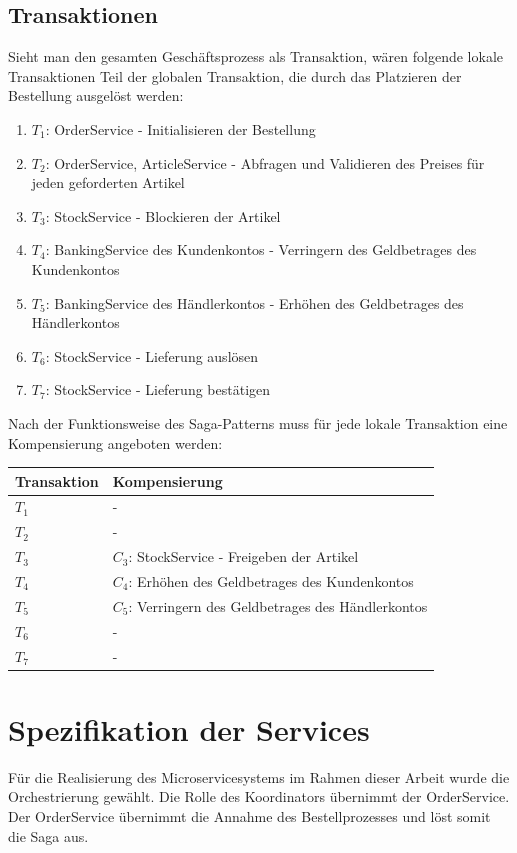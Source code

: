 \subsection{Transaktionen}
Sieht man den gesamten Geschäftsprozess als Transaktion, wären folgende lokale Transaktionen Teil der globalen Transaktion, die durch das Platzieren der Bestellung ausgelöst werden:
\begin{enumerate}
	\item $T_1$: OrderService - Initialisieren der Bestellung
	\item $T_2$: OrderService, ArticleService - Abfragen und Validieren des Preises für jeden geforderten Artikel 
	\item $T_3$: StockService - Blockieren der Artikel
	\item $T_4$: BankingService des Kundenkontos - Verringern des Geldbetrages des Kundenkontos
	\item $T_5$: BankingService des Händlerkontos - Erhöhen des Geldbetrages des Händlerkontos
	\item $T_6$: StockService - Lieferung auslösen
	\item $T_7$: StockService - Lieferung bestätigen
\end{enumerate}

Nach der Funktionsweise des Saga-Patterns muss für jede lokale Transaktion eine Kompensierung angeboten werden:

\begin{tabular}[h]{|l|l|}
	\hline
	Transaktion & Kompensierung \\ \hline
	$T_1$ & - \\ \hline
	$T_2$ & - \\ \hline
	$T_3$ & $C_3$: StockService - Freigeben der Artikel \\ \hline
	$T_4$ & $C_4$: Erhöhen des Geldbetrages des Kundenkontos \\ \hline
	$T_5$ & $C_5$: Verringern des Geldbetrages des Händlerkontos \\ \hline
	$T_6$ &  - \\ \hline
	$T_7$ &  - \\ \hline
\end{tabular}


\section{Spezifikation der Services}

Für die Realisierung des Microservicesystems im Rahmen dieser Arbeit wurde die Orchestrierung gewählt. %
Die Rolle des Koordinators übernimmt der OrderService. Der OrderService übernimmt die Annahme des Bestellprozesses und löst somit die Saga aus. 

